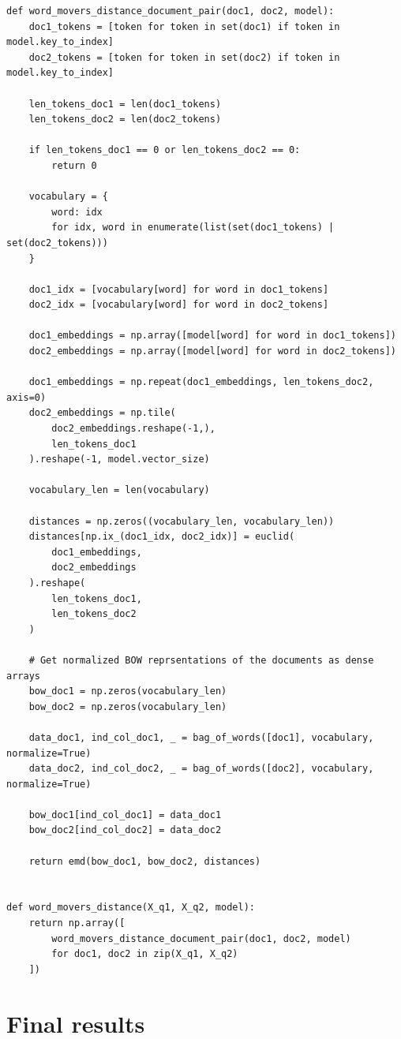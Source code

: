\documentclass[11pt,a4paper]{article}
\begin{document}
\begin{lstlisting}
def word_movers_distance_document_pair(doc1, doc2, model):
    doc1_tokens = [token for token in set(doc1) if token in model.key_to_index]
    doc2_tokens = [token for token in set(doc2) if token in model.key_to_index]

    len_tokens_doc1 = len(doc1_tokens)
    len_tokens_doc2 = len(doc2_tokens)

    if len_tokens_doc1 == 0 or len_tokens_doc2 == 0:
        return 0

    vocabulary = {
        word: idx
        for idx, word in enumerate(list(set(doc1_tokens) | set(doc2_tokens)))
    }

    doc1_idx = [vocabulary[word] for word in doc1_tokens]
    doc2_idx = [vocabulary[word] for word in doc2_tokens]

    doc1_embeddings = np.array([model[word] for word in doc1_tokens])
    doc2_embeddings = np.array([model[word] for word in doc2_tokens])

    doc1_embeddings = np.repeat(doc1_embeddings, len_tokens_doc2, axis=0)
    doc2_embeddings = np.tile(
        doc2_embeddings.reshape(-1,),
        len_tokens_doc1
    ).reshape(-1, model.vector_size)

    vocabulary_len = len(vocabulary)

    distances = np.zeros((vocabulary_len, vocabulary_len))
    distances[np.ix_(doc1_idx, doc2_idx)] = euclid(
        doc1_embeddings,
        doc2_embeddings
    ).reshape(
        len_tokens_doc1,
        len_tokens_doc2
    )

    # Get normalized BOW reprsentations of the documents as dense arrays
    bow_doc1 = np.zeros(vocabulary_len)
    bow_doc2 = np.zeros(vocabulary_len)

    data_doc1, ind_col_doc1, _ = bag_of_words([doc1], vocabulary, normalize=True)
    data_doc2, ind_col_doc2, _ = bag_of_words([doc2], vocabulary, normalize=True)

    bow_doc1[ind_col_doc1] = data_doc1
    bow_doc2[ind_col_doc2] = data_doc2

    return emd(bow_doc1, bow_doc2, distances)


def word_movers_distance(X_q1, X_q2, model):
    return np.array([
        word_movers_distance_document_pair(doc1, doc2, model)
        for doc1, doc2 in zip(X_q1, X_q2)
    ])
\end{lstlisting}

\section{Final results}

\nocite{*}





\end{document}
